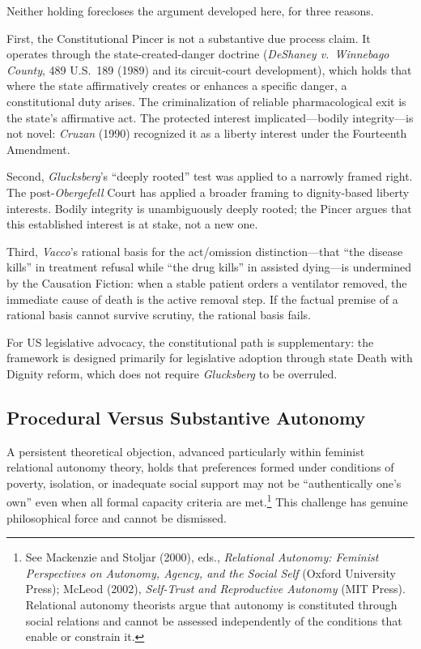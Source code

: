 \documentclass[11pt, letterpaper]{article}
\begin{document}
Neither holding forecloses the argument developed here, for three reasons.

First, the Constitutional Pincer is not a substantive due process claim. It operates
through the state-created-danger doctrine (\textit{DeShaney v.\ Winnebago County},
489 U.S.\ 189 (1989) and its circuit-court development), which holds that where the
state affirmatively creates or enhances a specific danger, a constitutional duty arises.
The criminalization of reliable pharmacological exit is the state's affirmative act.
The protected interest implicated---bodily integrity---is not novel: \textit{Cruzan}
(1990) recognized it as a liberty interest under the Fourteenth Amendment.

Second, \textit{Glucksberg}'s ``deeply rooted'' test was applied to a narrowly framed
right. The post-\textit{Obergefell} Court has applied a broader framing to dignity-based
liberty interests. Bodily integrity is unambiguously deeply rooted; the Pincer argues
that this established interest is at stake, not a new one.

Third, \textit{Vacco}'s rational basis for the act/omission distinction---that ``the
disease kills'' in treatment refusal while ``the drug kills'' in assisted dying---is
undermined by the Causation Fiction: when a stable patient orders a ventilator removed,
the immediate cause of death is the active removal step. If the factual premise of a
rational basis cannot survive scrutiny, the rational basis fails.

For US legislative advocacy, the constitutional path is supplementary: the framework is
designed primarily for legislative adoption through state Death with Dignity reform,
which does not require \textit{Glucksberg} to be overruled.

\subsection{Procedural Versus Substantive Autonomy}

A persistent theoretical objection, advanced particularly within feminist relational
autonomy theory, holds that preferences formed under conditions of poverty, isolation,
or inadequate social support may not be ``authentically one's own'' even when all formal
capacity criteria are met.\footnote{%
  See Mackenzie and Stoljar (2000), eds., \textit{Relational Autonomy: Feminist
  Perspectives on Autonomy, Agency, and the Social Self} (Oxford University Press);
  McLeod (2002), \textit{Self-Trust and Reproductive Autonomy} (MIT Press). Relational
  autonomy theorists argue that autonomy is constituted through social relations and
  cannot be assessed independently of the conditions that enable or constrain it.}
This challenge has genuine philosophical force and cannot be dismissed.
\end{document}
